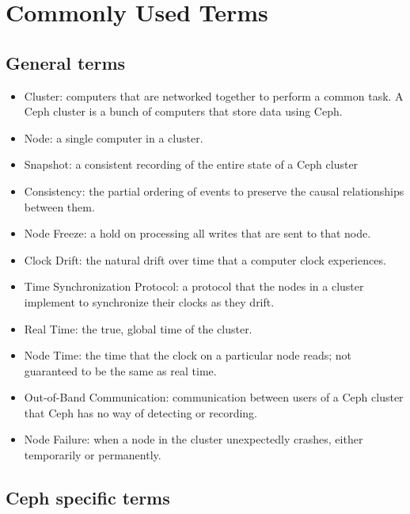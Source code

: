 \chapter{Commonly Used Terms}
\label{sec:terms}

\section{General terms}
\begin{itemize}
  \item Cluster: computers that are networked together to perform a
    common task. A Ceph cluster is a bunch of computers that store
    data using Ceph.
    
  \item Node: a single computer in a cluster.

  \item Snapshot: a consistent recording of the entire state of a Ceph cluster

  \item Consistency: the partial ordering of events to preserve the
    causal relationships between them.

  \item Node Freeze: a hold on processing all writes that are sent to
    that node.

  \item Clock Drift: the natural drift over time that a computer
    clock experiences.

  \item Time Synchronization Protocol: a protocol that the nodes in
    a cluster implement to synchronize their clocks as they drift.

  \item Real Time: the true, global time of the cluster.

  \item Node Time: the time that the clock on a particular node reads;
    not guaranteed to be the same as real time.

  \item Out-of-Band Communication: communication between users of a
    Ceph cluster that Ceph has no way of detecting or recording.

  \item Node Failure: when a node in the cluster unexpectedly
    crashes, either temporarily or permanently.
\end{itemize}

\section{Ceph specific terms}

